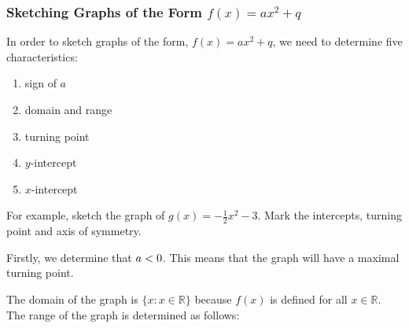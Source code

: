             \subsubsection{ Sketching Graphs of the Form $f\left(x\right)=a{x}^{2}+q$}
            \nopagebreak
          \label{m39345*id244525}In order to sketch graphs of the form, $f\left(x\right)=a{x}^{2}+q$, we need to determine five characteristics:\par 
          \label{m39345*id244564}\begin{enumerate}[noitemsep, label=\textbf{\arabic*}. ] 
            \label{m39345*uid124}\item sign of $a$\label{m39345*uid125}\item domain and range
\label{m39345*uid126}\item turning point
\label{m39345*uid127}\item $y$-intercept
\label{m39345*uid128}\item $x$-intercept
\end{enumerate}
          \label{m39345*id244652}For example, sketch the graph of $g\left(x\right)=-\frac{1}{2}{x}^{2}-3$. Mark the intercepts, turning point and axis of symmetry.\par 
          \label{m39345*id244698}Firstly, we determine that $a<{}0$. This means that the graph will have a maximal turning point.\par 
          \label{m39345*id244718}The domain of the graph is $\{x:x\in \mathbb{R}\}$ because $f\left(x\right)$ is defined for all $x\in \mathbb{R}$. The range of the graph is determined as follows:\par 
          \label{m39345*id244783}\nopagebreak\noindent{}
